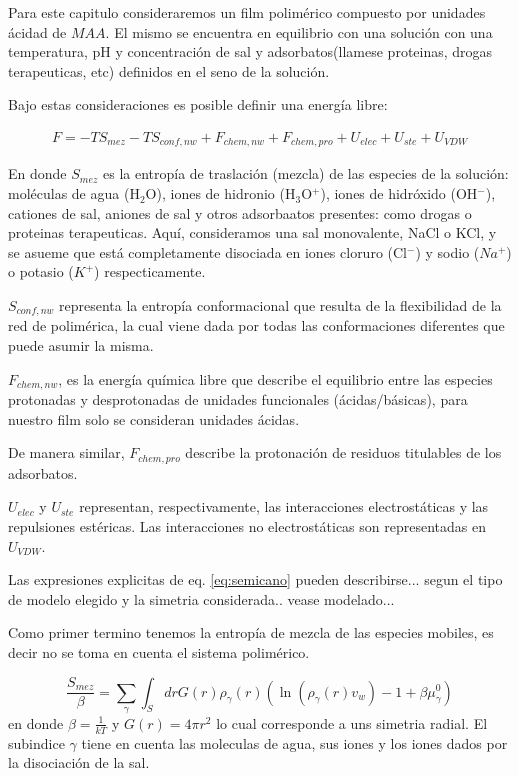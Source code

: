 Para este capitulo consideraremos un film polim\'erico compuesto por unidades \'acidad de $MAA$.
El mismo se encuentra en equilibrio con una soluci\'on con una temperatura, pH y concentraci\'on de sal y adsorbatos(llamese proteinas, drogas terapeuticas, etc) definidos en el seno de la soluci\'on.


Bajo estas consideraciones es posible definir una energ\'ia libre:

\begin{align}
 	F = -TS_{mez} -TS_{conf,nw} + F_{chem,nw} + F_{chem,pro} + U_{elec} + U_{ste} + U_{VDW} 
\end{align}
 
\noindent En donde $S_{mez}$ es la entropía de traslación (mezcla) de las especies de la solución: moléculas de agua (H$_2$O), iones de hidronio (H$_3$O$^+$), iones de hidróxido (OH$^- $), cationes de sal, aniones de sal y otros adsorbaatos presentes: como drogas o proteinas terapeuticas.
Aquí, consideramos una sal monovalente, NaCl o KCl, y se asueme que está completamente disociada en iones cloruro (Cl$^-$) y sodio ($Na^+$) o potasio ($K^+$) respecticamente. 

$S_{conf,nw}$ representa la entrop\'ia conformacional que resulta de la flexibilidad de la red de polim\'erica, la cual viene dada por todas las conformaciones diferentes que puede asumir la misma.

$F_{chem,nw}$, es la energ\'ia qu\'imica libre que describe el equilibrio entre las especies protonadas y desprotonadas de unidades funcionales (\'acidas/b\'asicas), para nuestro film solo se consideran unidades \'acidas.

De manera similar, $F_{chem,pro}$ describe la protonaci\'on de residuos titulables de los adsorbatos.

$U_{elec}$ y $U_{ste}$ representan, respectivamente, las interacciones electrost\'aticas y las repulsiones est\'ericas.
Las interacciones no electrost\'aticas son representadas en $U_{VDW}$.


Las expresiones explicitas de eq. \ref{eq:semicano} pueden describirse... segun el tipo de modelo elegido y la simetria considerada.. vease modelado...

Como primer termino tenemos la entrop\'ia de mezcla de  las especies mobiles, es decir no se toma en cuenta el sistema polim\'erico.

\begin{equation}
\frac{S_{mez}}{\beta}= \sum_{\gamma}\int_S{dr G(r)\rho_\gamma(r)\left(\ln \left(\rho_\gamma (r)v_w\right) -1 + \beta\mu^0_\gamma\right)}
\end{equation}
\noindent en donde $\beta = \frac{1}{kT}$ y $G(r) = 4\pi r^2$ lo cual corresponde a uns simetria radial. El subindice $\gamma$ tiene en cuenta las moleculas de agua, sus iones y los iones dados por la disociaci\'on de la sal.

